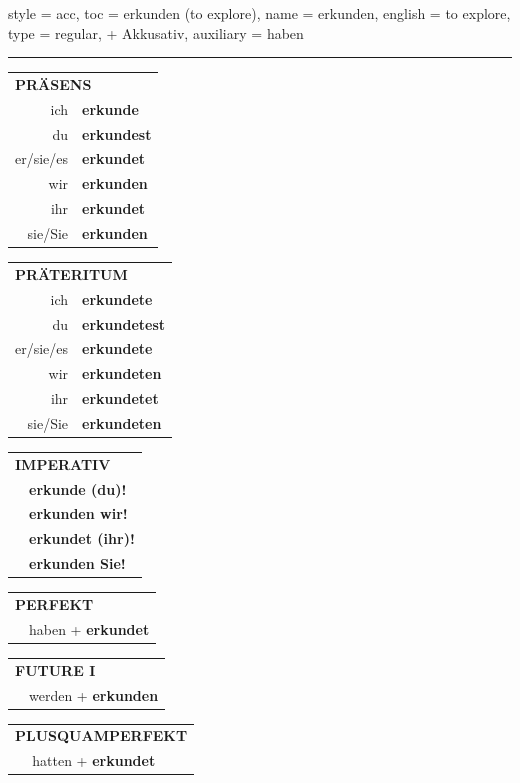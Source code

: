 \begin{verbentry}{
  style = {acc},
  toc = {erkunden (to explore)},
  name = {erkunden},
  english = {to explore},
  type = {regular, + Akkusativ},
  auxiliary = {haben}
}


\vspace{5pt}
\hrule
\vspace{5pt}

\begin{tabular}{rl}
\multicolumn{2}{l}{\textbf{PRÄSENS}}\\
ich & \textbf{erkunde}\\
du & \textbf{erkundest}\\
er/sie/es & \textbf{erkundet}\\
wir & \textbf{erkunden}\\
ihr & \textbf{erkundet}\\
sie/Sie & \textbf{erkunden}\\
\end{tabular}
\hfill
\begin{tabular}{rl}
\multicolumn{2}{l}{\textbf{PRÄTERITUM}}\\
ich & \textbf{erkundete}\\
du & \textbf{erkundetest}\\
er/sie/es & \textbf{erkundete}\\
wir & \textbf{erkundeten}\\
ihr & \textbf{erkundetet}\\
sie/Sie & \textbf{erkundeten}\\
\end{tabular}
\hfill
\begin{tabular}{rl}
\multicolumn{2}{l}{\textbf{IMPERATIV}}\\
& \textbf{erkunde (du)!}\\
& \textbf{erkunden wir!}\\
& \textbf{erkundet (ihr)!}\\
& \textbf{erkunden Sie!}\\
\end{tabular}

\vspace{10pt}

\begin{tabular}{rl}
\multicolumn{2}{l}{\textbf{PERFEKT}}\\
& haben + \textbf{erkundet}\\
\end{tabular}
\hfill
\begin{tabular}{rl}
\multicolumn{2}{l}{\textbf{FUTURE I}}\\
& werden + \textbf{erkunden}\\
\end{tabular}
\hfill
\begin{tabular}{rl}
\multicolumn{2}{l}{\textbf{PLUSQUAMPERFEKT}}\\
& hatten + \textbf{erkundet}\\
\end{tabular}


\end{verbentry}
